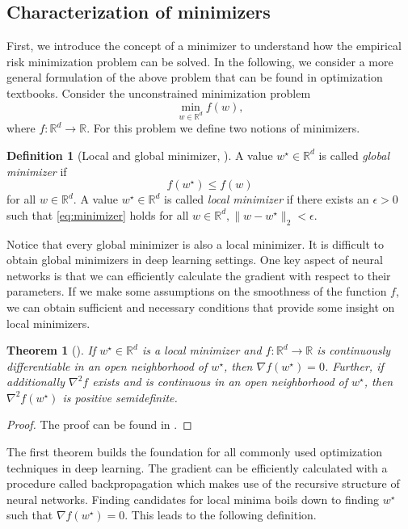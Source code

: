 \documentclass[12pt]{article}
\newtheorem{theorem}{Theorem}[section]
\theoremstyle{definition}
\newtheorem{definition}[definition]{Definition}
\numberwithin{equation}{section}
\newcommand{\norm}[1]{\lVert{#1}\rVert_2}
\begin{document}
\subsection{Characterization of minimizers}
First, we introduce the concept of a minimizer to understand how the empirical risk minimization problem can be solved. In the following, we consider a more general formulation of the above problem that can be found in optimization textbooks. Consider the unconstrained minimization problem
\begin{equation}
  \min_{w \in \mathbb{R}^d} f(w),
\end{equation}
where $f:\mathbb{R}^d \rightarrow \mathbb{R}$.
For this problem we define two notions of minimizers.
\begin{definition}[Local and global minimizer, ]
  A value $w^\star \in \mathbb{R}^d$ is called \emph{global minimizer} if 
  \begin{equation}
    \label{eq:minimizer}
    f(w^\star) \leq f(w)
  \end{equation} 
  for all $w \in \mathbb{R}^d$. A value $w^\star \in \mathbb{R}^d$ is called \emph{local minimizer} if there exists an $\epsilon > 0$ such that \eqref{eq:minimizer} holds for all $w \in \mathbb{R}^d, \norm{w-w^\star} < \epsilon$.
\end{definition}
Notice that every global minimizer is also a local minimizer. It is difficult to obtain global minimizers in deep learning settings. One key aspect of neural networks is that we can efficiently calculate the gradient with respect to their parameters. If we make some assumptions on the smoothness of the function $f$, we can obtain sufficient and necessary conditions that provide some insight on local minimizers.
\begin{theorem}[]
  If $w^\star \in \mathbb{R}^d$ is a local minimizer and $f:\mathbb{R}^d \rightarrow \mathbb{R}$ is continuously differentiable in an open neighborhood of $w^\star$, then $\nabla f(w^\star) = 0$. Further, if additionally $\nabla^2 f$ exists and is continuous in an open neighborhood of $w^\star$, then $\nabla^2f(w^\star)$ is positive semidefinite.
\end{theorem}
\begin{proof}
  The proof can be found in \autocite{nocedalNumericalOptimization2006}.
\end{proof}
The first theorem builds the foundation for all commonly used optimization techniques in deep learning. The gradient can be  efficiently calculated with a procedure called backpropagation which makes use of the recursive structure of neural networks. Finding candidates for local minima boils down to finding $w^\star$ such that $\nabla f(w^\star) = 0$. This leads to the following definition.
\end{document}
